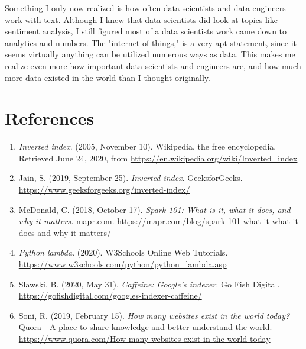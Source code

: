\documentclass[]{article}
\begin{document}
Something I only now realized is how often data scientists and data engineers work with text.  Although I knew that data scientists did look at topics like sentiment analysis, I still figured most of a data scientists work came down to analytics and numbers.  The "internet of things," is a very apt statement, since it seems virtually anything can be utilized numerous ways as data.  This makes me realize even more how important data scientists and engineers are, and how much more data existed in the world than I thought originally.

\section{References}


\begin{enumerate}
	\item \textit{Inverted index}. (2005, November 10). Wikipedia, the free encyclopedia. Retrieved June 24, 2020, from \url{https://en.wikipedia.org/wiki/Inverted\_index}
	
	\item Jain, S. (2019, September 25). \textit{Inverted index}. GeeksforGeeks. \url{https://www.geeksforgeeks.org/inverted-index/}
	
	\item McDonald, C. (2018, October 17). \textit{Spark 101: What is it, what it does, and why it matters.} mapr.com. \url{https://mapr.com/blog/spark-101-what-it-what-it-does-and-why-it-matters/}
	
	\item \textit{Python lambda}. (2020). W3Schools Online Web Tutorials. \url{https://www.w3schools.com/python/python\_lambda.asp}
	
	\item Slawski, B. (2020, May 31). \textit{Caffeine: Google's indexer}. Go Fish Digital. \url{https://gofishdigital.com/googles-indexer-caffeine/}
	
	\item Soni, R. (2019, February 15). \textit{How many websites exist in the world today?} Quora - A place to share knowledge and better understand the world. \url{https://www.quora.com/How-many-websites-exist-in-the-world-today}
	
\end{enumerate}
\end{document}
